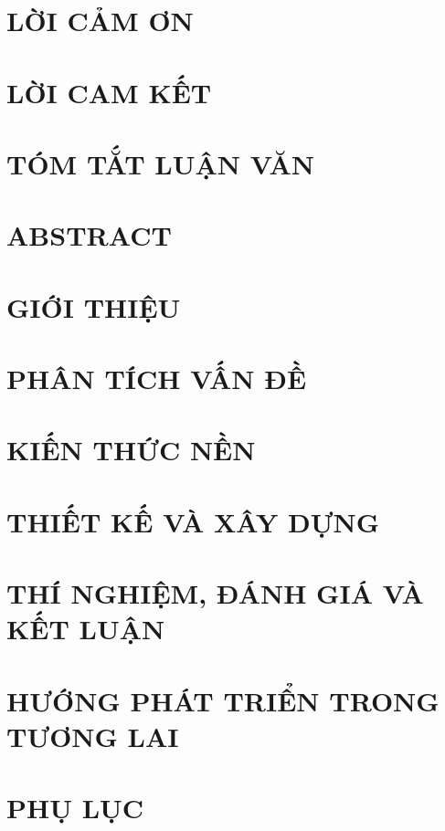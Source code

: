 \documentclass[14pt]{hcmutarticle}
\newcommand\blankpage{
    \null
    \thispagestyle{empty}
    \addtocounter{page}{-1}
    \newpage}
\begin{document}



\afterpage{\blankpage}

\setcounter{secnumdepth}{-2}

\newpage
\chapter{LỜI CẢM ƠN}


\newpage
\chapter{LỜI CAM KẾT}


\newpage
\chapter{TÓM TẮT LUẬN VĂN}


\newpage
\chapter{ABSTRACT}


\newpage
\tableofcontents
\setcounter{secnumdepth}{5}

\newpage
\listoffigures

\newpage
\listoftables

\newpage
{}
\chapter{GIỚI THIỆU}


\newpage
\chapter{PHÂN TÍCH VẤN ĐỀ}


\newpage
\chapter{KIẾN THỨC NỀN}


\newpage
\chapter{THIẾT KẾ VÀ XÂY DỰNG}


\newpage
\chapter{THÍ NGHIỆM, ĐÁNH GIÁ VÀ KẾT LUẬN}


\newpage
\chapter{HƯỚNG PHÁT TRIỂN TRONG TƯƠNG LAI}


\newpage
\chapter{PHỤ LỤC}

\end{document}
